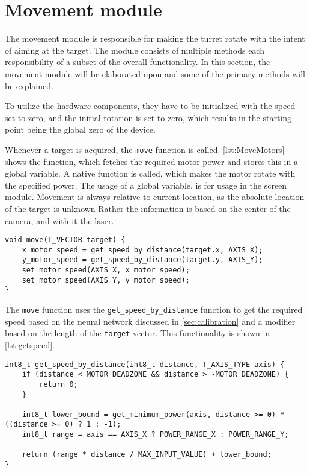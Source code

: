 \section{Movement module}
\label{sec:movement}
The movement module is responsible for making the turret rotate with the intent of aiming at the target.
The module consists of multiple methods each responsibility of a subset of the overall functionality.
In this section, the movement module will be elaborated upon and some of the primary methods will be explained.

To utilize the hardware components, they have to be initialized with the speed set to zero, and the initial rotation is set to zero, which results in the starting point being the global zero of the device.

Whenever a target is acquired, the \texttt{move} function is called.
 \autoref{lst:MoveMotors} shows the function, which fetches the required motor power and stores this in a global variable.
A native function is called, which makes the motor rotate with the specified power.
The usage of a global variable, is for usage in the screen module.
Movement is always relative to current location, as the absolute location of the target is unknown
Rather the information is based on the center of the camera, and with it the laser.

\begin{lstlisting}[language=CSharp,caption={move method from movement.c},label={lst:MoveMotors}]
void move(T_VECTOR target) {
    x_motor_speed = get_speed_by_distance(target.x, AXIS_X);
    y_motor_speed = get_speed_by_distance(target.y, AXIS_Y);
    set_motor_speed(AXIS_X, x_motor_speed);
    set_motor_speed(AXIS_Y, y_motor_speed);
}
\end{lstlisting}


The \texttt{move} function uses the \texttt{get\_speed\_by\_distance} function to get the required speed based on the neural network discussed in \autoref{sec:calibration} and a modifier based on the length of the \texttt{target} vector.
This functionality is shown in \autoref{lst:getspeed}.

\begin{lstlisting}[language=CSharp,caption={get\_speed\_by\_distance method from movement.c},label={lst:getspeed},firstnumber={109}]
int8_t get_speed_by_distance(int8_t distance, T_AXIS_TYPE axis) {
    if (distance < MOTOR_DEADZONE && distance > -MOTOR_DEADZONE) {
        return 0;
    }

    int8_t lower_bound = get_minimum_power(axis, distance >= 0) * ((distance >= 0) ? 1 : -1);
    int8_t range = axis == AXIS_X ? POWER_RANGE_X : POWER_RANGE_Y;

    return (range * distance / MAX_INPUT_VALUE) + lower_bound;
}
\end{lstlisting}

